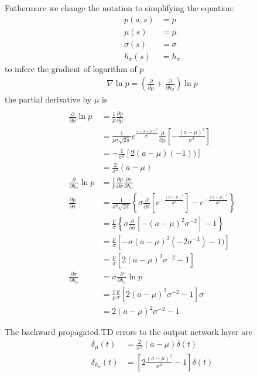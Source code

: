 \documentclass[]{article}
\begin{document}
Futhermore we change the notation to simplifying the equation:
\begin{align*}
	p(a, s)& = p
	\\
	\mu(s)& = \mu
	\\
	\sigma(s)& = \sigma
	\\
	h_\sigma(s)& = h_\sigma
\end{align*}
to infere the gradient of logarithm of $ p $
\begin{align*}
\nabla \ln p = \left(
	\frac{\partial}{\partial \mu} + \frac{\partial}{\partial h_\sigma}
	\right)
	\ln p
\end{align*}
the partial derivative by $\mu$ is 
\begin{align*}
\\
	\frac{\partial}{\partial \mu} \ln p& = \frac{1}{p} \frac{\partial p}{\partial \mu}
	\\
	& = \frac{1}{p \sigma \sqrt{2 \pi} } e^{\frac{-(a-\mu)^2}{\sigma^2}} \frac{\partial}{\partial \mu} \left[ -\frac{(a-\mu)^2}{\sigma^2} \right]
	\\
	& = - \frac{1}{\sigma^2}[2 (a - \mu) (-1))]
	\\
	& = \frac{2}{\sigma^2}(a - \mu)
	\\
	\frac{\partial}{\partial h_\sigma} \ln p& = \frac{1}{p} \frac{\partial p}{\partial \sigma} \frac{\partial \sigma}{\partial h_\sigma}
	\\
	\frac{\partial p}{\partial \sigma}& = \frac{1}{\sigma^2 \sqrt{2 \pi}}
	\left\{
		\sigma \frac{\partial}{\partial \sigma}
		\left[
			e^{-\frac{(a-\mu)^2}{\sigma^2}}
		\right]
		- e^{-\frac{(a-\mu)^2}{\sigma^2}}
	\right\}
	\\
	& = \frac{p}{\sigma}
	\left\{
		\sigma \frac{\partial}{\partial \sigma}
		\left[
			-(a - \mu)^2\sigma^{-2}
		\right] - 1
	\right\}
	\\
	& = \frac{p}{\sigma}
	\left[
		-\sigma (a - \mu)^2 (-2 \sigma^{-3}) - 1)
	\right]
	\\
	& = \frac{p}{\sigma}
	\left[
		2(a-\mu)^2 \sigma^{-2} - 1
	\right]
	\\
	\frac{\partial \sigma}{\partial h_\sigma}& = \sigma
	\frac{\partial}{\partial h_\sigma} \ln p
	\\
	& = \frac{1}{p}
	\frac{p}{\sigma}
	\left[
		2(a-\mu)^2 \sigma^{-2} - 1
	\right] \sigma
	\\
	& = 2(a-\mu)^2 \sigma^{-2} - 1
\end{align*}

The backward propagated TD errors to the output network layer are
\begin{align}
	\delta_\mu(t)&		= \frac{2}{\sigma^2}(a - \mu) \delta (t)
	\\
	\delta_{h_\sigma}(t)&	= \left[
		2\frac{(a - \mu)^2}{\sigma^2} - 1
	\right] \delta(t)
\end{align}
\end{document}
